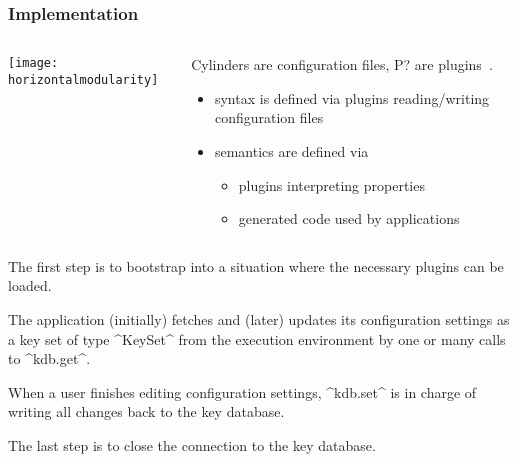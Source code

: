 \begin{frame}
	\frametitle{Implementation}
	\begin{columns}[c]
	\begin{column}{6cm}
	\texttt{[image: horizontalmodularity]}
	\end{column}
	\begin{column}{5cm}
	Cylinders are configuration files, P? are plugins~\cite{raab2016improving}.

	\begin{itemize}
	\item syntax is defined via plugins reading/writing configuration files
	\item semantics are defined via
		\begin{itemize}
		\item plugins interpreting properties
		\item generated code used by applications
		\end{itemize}
	\end{itemize}
	\end{column}
	\end{columns}
\end{frame}

\begin{frame}[fragile]
	\begin{description}[align=left]
	\item[kdb.open():]
	The first step is to bootstrap into a situation where the necessary plugins can be loaded.
	\item[kdb.get(\texttt{KeySet}):] 
	The application (initially) fetches and (later) updates its configuration settings as a key set of type ^KeySet^ from the execution environment by one or many calls to ^kdb.get^.
	\item[kdb.set(\texttt{KeySet}):] 
	When a user finishes editing configuration settings, ^kdb.set^ is in charge of writing all changes back to the key database.
	\item[kdb.close():] 
	The last step is to close the connection to the key database.
	\end{description}
\end{frame}

